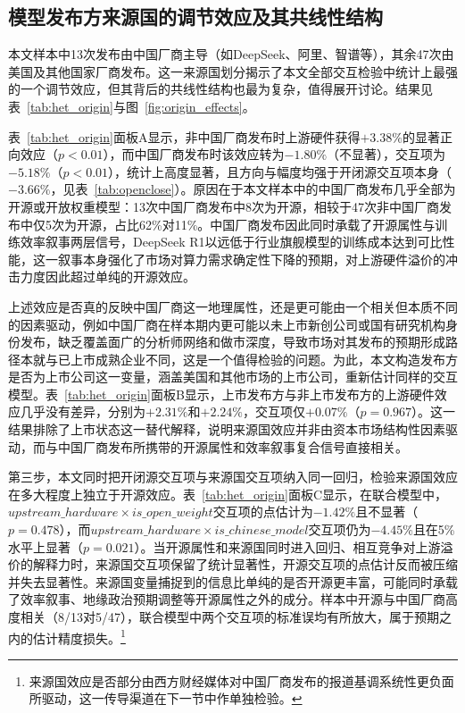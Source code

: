\documentclass[11pt,fontset=fandol,a4paper]{ctexart}
\newcommand{\changed}[1]{#1}
\begin{document}
\subsection{模型发布方来源国的调节效应及其共线性结构}\label{sec:origin_het}

本文样本中13次发布由中国厂商主导（如DeepSeek、阿里、智谱等），其余47次由美国及其他国家厂商发布。这一来源国划分揭示了本文全部交互检验中统计上最强的一个调节效应，但其背后的共线性结构也最为复杂，值得展开讨论。结果见表~\ref{tab:het_origin}与图~\ref{fig:origin_effects}。

表~\ref{tab:het_origin}面板A显示，非中国厂商发布时上游硬件获得$+3.38\%$的显著正向效应（$p<0.01$），而中国厂商发布时该效应转为$-1.80\%$（不显著），交互项为$-5.18\%$（$p<0.01$），统计上高度显著，且方向与幅度均强于开闭源交互项本身（$-3.66\%$，见表~\ref{tab:openclose}）。原因在于本文样本中的中国厂商发布几乎全部为开源或开放权重模型：13次中国厂商发布中8次为开源，相较于47次非中国厂商发布中仅5次为开源，占比62\%对11\%。中国厂商发布因此同时承载了开源属性与训练效率叙事两层信号，DeepSeek R1以远低于行业旗舰模型的训练成本达到可比性能，这一叙事本身强化了市场对算力需求确定性下降的预期，对上游硬件溢价的冲击力度因此超过单纯的开源效应。

\changed{上述效应是否真的反映中国厂商这一地理属性，还是更可能由一个相关但本质不同的因素驱动，例如中国厂商在样本期内更可能以未上市新创公司或国有研究机构身份发布，缺乏覆盖面广的分析师网络和做市深度，导致市场对其发布的预期形成路径本就与已上市成熟企业不同，这是一个值得检验的问题。为此，本文构造发布方是否为上市公司这一变量，涵盖美国和其他市场的上市公司，重新估计同样的交互模型。表~\ref{tab:het_origin}面板B显示，上市发布方与非上市发布方的上游硬件效应几乎没有差异，分别为$+2.31\%$和$+2.24\%$，交互项仅$+0.07\%$（$p=0.967$）。这一结果排除了上市状态这一替代解释，说明来源国效应并非由资本市场结构性因素驱动，而与中国厂商发布所携带的开源属性和效率叙事复合信号直接相关。}

第三步，本文同时把开闭源交互项与来源国交互项纳入同一回归，检验来源国效应在多大程度上独立于开源效应。表~\ref{tab:het_origin}面板C显示，在联合模型中，$upstream\_hardware \times is\_open\_weight$交互项的点估计为$-1.42\%$且不显著（$p=0.478$），而$upstream\_hardware \times is\_chinese\_model$交互项仍为$-4.45\%$且在5\%水平上显著（$p=0.021$）。当开源属性和来源国同时进入回归、相互竞争对上游溢价的解释力时，来源国交互项保留了统计显著性，开源交互项的点估计反而被压缩并失去显著性。来源国变量捕捉到的信息比单纯的是否开源更丰富，可能同时承载了效率叙事、地缘政治预期调整等开源属性之外的成分。样本中开源与中国厂商高度相关（8/13对5/47），联合模型中两个交互项的标准误均有所放大，属于预期之内的估计精度损失。\footnote{来源国效应是否部分由西方财经媒体对中国厂商发布的报道基调系统性更负面所驱动，这一传导渠道在下一节中作单独检验。}
\end{document}
